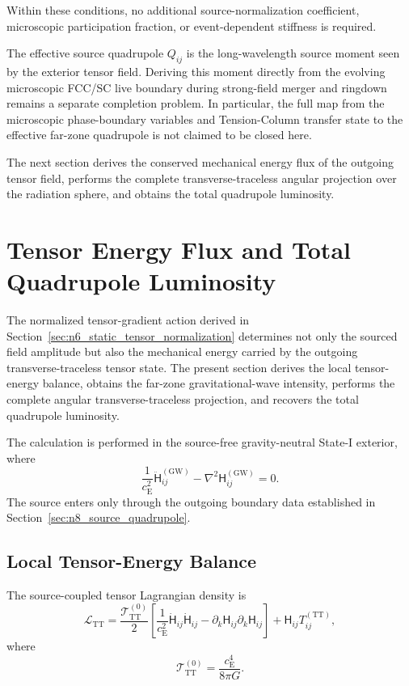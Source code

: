 Within these conditions, no additional source-normalization coefficient, microscopic participation fraction, or event-dependent stiffness is required.

The effective source quadrupole $Q_{ij}$ is the long-wavelength source moment seen by the exterior tensor field. Deriving this moment directly from the evolving microscopic FCC/SC live boundary during strong-field merger and ringdown remains a separate completion problem. In particular, the full map from the microscopic phase-boundary variables and Tension-Column transfer state to the effective far-zone quadrupole is not claimed to be closed here.

The next section derives the conserved mechanical energy flux of the outgoing tensor field, performs the complete transverse-traceless angular projection over the radiation sphere, and obtains the total quadrupole luminosity.

\section{Tensor Energy Flux and Total Quadrupole Luminosity}
\label{sec:n9_tensor_energy_flux}

The normalized tensor-gradient action derived in Section~\ref{sec:n6_static_tensor_normalization} determines not only the sourced field amplitude but also the mechanical energy carried by the outgoing transverse-traceless tensor state. The present section derives the local tensor-energy balance, obtains the far-zone gravitational-wave intensity, performs the complete angular transverse-traceless projection, and recovers the total quadrupole luminosity.

The calculation is performed in the source-free gravity-neutral State-I exterior, where
\begin{equation}
    \frac{1}{c_{\mathrm{E}}^{2}} \ddot{\mathsf{H}}_{ij}^{(\mathrm{GW})} - \nabla^{2} \mathsf{H}_{ij}^{(\mathrm{GW})} = 0.
    \label{eq:n9_source_free_wave_equation}
\end{equation}
The source enters only through the outgoing boundary data established in Section~\ref{sec:n8_source_quadrupole}.

\subsection{Local Tensor-Energy Balance}
\label{subsec:n9_local_energy_balance}

The source-coupled tensor Lagrangian density is
\begin{equation}
    \mathcal{L}_{\mathrm{TT}} = \frac{ \mathcal{T}_{\mathrm{TT}}^{(0)} }{2} \left[ \frac{1}{c_{\mathrm{E}}^{2}} \dot{\mathsf{H}}_{ij} \dot{\mathsf{H}}_{ij} - \partial_{k}\mathsf{H}_{ij} \partial_{k}\mathsf{H}_{ij} \right] + \mathsf{H}_{ij} T_{ij}^{(\mathrm{TT})},
    \label{eq:n9_tensor_lagrangian}
\end{equation}
where
\begin{equation}
    \mathcal{T}_{\mathrm{TT}}^{(0)} = \frac{c_{\mathrm{E}}^{4}}{8\pi G}.
    \label{eq:n9_tensor_gradient_coefficient}
\end{equation}

